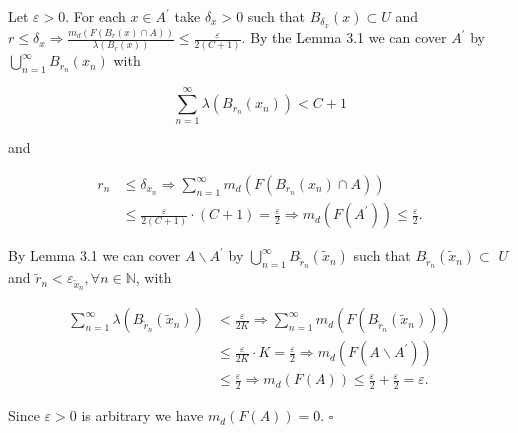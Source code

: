 \documentclass[10pt]{article}
\begin{document}
Let $\varepsilon>0$. For each $x \in A^{\prime}$ take $\delta_{x}>0$ such that $B_{\delta_{x}}(x) \subset U$ and $r \leq \delta_{x} \Rightarrow \frac{m_{d}\left(F\left(B_{r}(x) \cap A\right)\right)}{\lambda\left(B_{r}(x)\right)} \leq \frac{\varepsilon}{2(C+1)}$. By the Lemma 3.1 we can cover $A^{\prime}$ by $\bigcup_{n=1}^{\infty} B_{r_{n}}\left(x_{n}\right)$ with

$$
\sum_{n=1}^{\infty} \lambda\left(B_{r_{n}}\left(x_{n}\right)\right)<C+1
$$

and

$$
\begin{aligned}
r_{n} & \leq \delta_{x_{n}} \Rightarrow \sum_{n=1}^{\infty} m_{d}\left(F\left(B_{r_{n}}\left(x_{n}\right) \cap A\right)\right) \\
& \leq \frac{\varepsilon}{2(C+1)} \cdot(C+1)=\frac{\varepsilon}{2} \Rightarrow m_{d}\left(F\left(A^{\prime}\right)\right) \leq \frac{\varepsilon}{2} .
\end{aligned}
$$

By Lemma 3.1 we can cover $A \backslash A^{\prime}$ by $\bigcup_{n=1}^{\infty} B_{\tilde{r}_{n}}\left(\widetilde{x}_{n}\right)$ such that $B_{\tilde{r}_{n}}\left(\widetilde{x}_{n}\right) \subset$ $U$ and $\tilde{r}_{n}<\varepsilon_{\widetilde{x}_{n}}, \forall n \in \mathbb{N}$, with

$$
\begin{aligned}
\sum_{n=1}^{\infty} \lambda\left(B_{\tilde{r}_{n}}\left(\widetilde{x}_{n}\right)\right) & <\frac{\varepsilon}{2 K} \Rightarrow \sum_{n=1}^{\infty} m_{d}\left(F\left(B_{\tilde{r}_{n}}\left(\widetilde{x}_{n}\right)\right)\right) \\
& \leq \frac{\varepsilon}{2 K} \cdot K=\frac{\varepsilon}{2} \Rightarrow m_{d}\left(F\left(A \backslash A^{\prime}\right)\right) \\
& \leq \frac{\varepsilon}{2} \Rightarrow m_{d}(F(A)) \leq \frac{\varepsilon}{2}+\frac{\varepsilon}{2}=\varepsilon .
\end{aligned}
$$

Since $\varepsilon>0$ is arbitrary we have $m_{d}(F(A))=0$. \(\square\)
\end{document}
